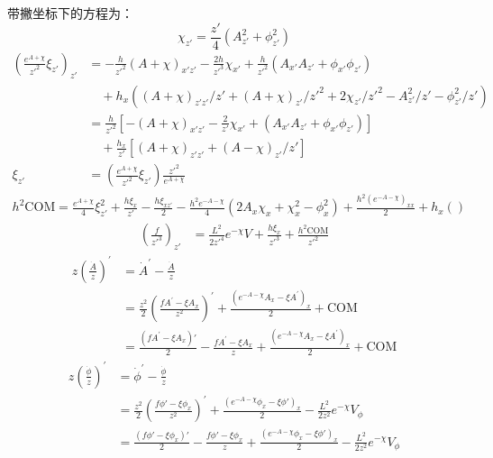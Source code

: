 \documentclass[12pt,a4paper]{ctexart}
\numberwithin{equation}{section}
\begin{document}
带撇坐标下的方程为：
\begin{equation}
    \chi_{z'}=\frac{z'}{4}(A_{z'}^2+\phi_{z'}^2)
\end{equation}
\begin{equation}
    \begin{aligned}
        \left(\frac{e^{A+\chi}}{z'^2}\xi_{z'}\right)_{z'}&=-\frac{h}{z'^2}(A+\chi)_{x'z'}-\frac{2h}{z'^3}\chi_{x'}+\frac{h}{z'^2}(A_{x'}A_{z'}+\phi_{x'}\phi_{z'})\\
        &\quad+h_x((A+\chi)_{z'z'}/z'+(A+\chi)_{z'}/z'^2+2\chi_{z'}/z'^2-A_{z'}^2/z'-\phi_{z'}^2/z')\\
        &=\frac{h}{z'^2}[-(A+\chi)_{x'z'}-\frac{2}{z'}\chi_{x'}+(A_{x'}A_{z'}+\phi_{x'}\phi_{z'})]\\
        &\quad+\frac{h_x}{z'}[(A+\chi)_{z'z'}+(A-\chi)_{z'}/z']\\
        \xi_{z'}&=\left(\frac{e^{A+\chi}}{z'^2}\xi_{z'}\right)\frac{z'^2}{e^{A+\chi}}
    \end{aligned}
\end{equation}
\begin{equation}
    \begin{aligned}
        h^2\mathrm{COM}=\frac{e^{A+\chi}}{4}\xi_{z'}^{2}+\frac{h\xi_{x}}{z'}-\frac{h\xi_{xz'}}{2}-\frac{h^2e^{-A-\chi}}{4}(2A_x\chi_x+\chi_{x}^2-\phi_x^2)+\frac{h^2(e^{-A-\chi})_{xx}}{2}+h_x()
    \end{aligned}
\end{equation}
\begin{equation}
    \begin{aligned}
        (\frac{f}{z'^{3}})_{z'}&=\frac{L^{2}}{2z'^{4}}e^{-\chi}V+\frac{h\xi_{x}}{z'^{3}}+\frac{h^2\mathrm{COM}}{z'^{2}}
    \end{aligned}
\end{equation}
\begin{equation}
    \begin{aligned}
        z(\frac{\dot{A}}{z})^{\prime}&=\dot{A}^{\prime}-\frac{\dot{A}}{z}\\
        &=\frac{z^{2}}{2}(\frac{fA^{\prime}-\xi A_{x}}{z^{2}})^{\prime}+\frac{(e^{-A-\chi}A_{x}-\xi A^{\prime})_{x}}{2}+\mathrm{COM}\\
        &=\frac{(fA^{\prime}-\xi A_{x})'}{2}-\frac{fA^{\prime}-\xi A_{x}}{z}+\frac{(e^{-A-\chi}A_{x}-\xi A^{\prime})_{x}}{2}+\mathrm{COM}
    \end{aligned}
\end{equation}
\begin{equation}
    \begin{aligned}
        z(\frac{\dot{\phi}}{z})^{\prime}&=\dot{\phi}^{\prime}-\frac{\dot{\phi}}{z}\\
        &=\frac{z^{2}}{2}(\frac{f\phi'-\xi\phi_{x}}{z^{2}})^{\prime}+\frac{(e^{-A-\chi}\phi_{x}-\xi\phi')_{x}}{2}-\frac{L^{2}}{2z^{2}}e^{-\chi}V_\phi\\
        &=\frac{(f\phi'-\xi\phi_{x})'}{2}-\frac{f\phi'-\xi\phi_{x}}{z}+\frac{(e^{-A-\chi}\phi_{x}-\xi\phi')_{x}}{2}-\frac{L^{2}}{2z^{2}}e^{-\chi}V_\phi
    \end{aligned}
\end{equation}
\end{document}
